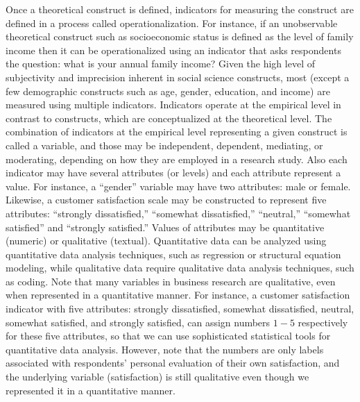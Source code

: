 Once a theoretical construct is defined, indicators for measuring the construct are defined in a process called operationalization. For instance, if an unobservable theoretical construct such as socioeconomic status is defined as the level of family income then it can be operationalized using an indicator that asks respondents the question: what is your annual family income? Given the high level of subjectivity and imprecision inherent in social science constructs, most (except a few demographic constructs such as age, gender, education, and income) are measured using multiple indicators.
Indicators operate at the empirical level in contrast to constructs, which are conceptualized at the theoretical level. The combination of indicators at the empirical level representing a given construct is called a variable, and those may be independent, dependent, mediating, or moderating, depending on how they are employed in a research study. Also each indicator may have several attributes (or levels) and each attribute represent a value. For instance, a ``gender'' variable may have two attributes: male or female. Likewise, a customer satisfaction scale may be constructed to represent five attributes: ``strongly dissatisfied,'' ``somewhat dissatisfied,'' ``neutral,'' ``somewhat satisfied'' and ``strongly satisfied.'' Values of attributes may be quantitative (numeric) or qualitative (textual). Quantitative data can be analyzed using quantitative data analysis techniques, such as regression or structural equation modeling, while qualitative data require qualitative data analysis techniques, such as coding. Note that many variables in business research are qualitative, even when represented in a quantitative manner. For instance, a customer satisfaction indicator with five attributes: strongly dissatisfied, somewhat dissatisfied, neutral, somewhat satisfied, and strongly satisfied, can assign numbers $ 1-5 $ respectively for these five attributes, so that we can use sophisticated statistical tools for quantitative data analysis. However, note that the numbers are only labels associated with respondents' personal evaluation of their own satisfaction, and the underlying variable (satisfaction) is still qualitative even though we represented it in a quantitative manner.

